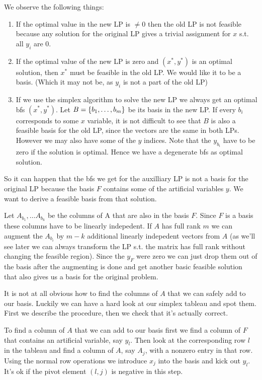 We observe the following things:

\begin{enumerate}
\item If the optimal value in the new LP is $\neq 0$ then the old LP is not feasible because any solution for the original LP gives a trivial assignment for $x$ s.t. all $y_i$ are 0.
\item If the optimal value of the new LP is zero and $(x^*, y^*)$ is an optimal solution, then $x^*$ must be feasible in the old LP. We would like it to be a basis. (Which it may not be, as $y_i$ is not a part of the old LP)
\item If we use the simplex algorithm to solve the new LP we always get an optimal bfs $(x^*,y^*)$. Let $B=\{{b}_1,\ldots,{b}_{m}\}$ be its basis in the new LP. If every $b_i$ corresponds to some $x$ variable, it is not difficult to see that $B$ is also a feasible basis for the old LP, since the vectors are the same in both LPs. However we may also have some of the $y$ indices. Note that the $y_{b_i}$ have to be zero if the solution is optimal. Hence we have a degenerate bfs as optimal solution.
\end{enumerate}

So it can happen that the bfs we get for the auxilliary LP is not a basis for the original LP because the basis $F$ contains some of the artificial variables $y$. We want to derive a feasible basis from that solution.

Let $A_{b_1},\ldots A_{b_k}$ be the columns of A that are also in the basis $F$. Since $F$ is a basis these columns have to be linearly indepedent. If $A$ has full rank $m$ we can augment the $A_{b_i}$ by $m-k$ additional linearly indepedent vectors from $A$ (as we'll see later we can always transform the LP s.t. the matrix has full rank without changing the feasible region). Since the $y_F$ were zero we can just drop them out of the basis after the augmenting is done and get another basic feasible solution that also gives us a basis for the original problem.

It is not at all obvious how to find the columns of $A$ that we can safely add to our basis. Luckily we can have a hard look at our simplex tableau and spot them. First we describe the procedure, then we check that it's actually correct.

To find a column of $A$ that we can add to our basis first we find a column of $F$ that contains an artificial variable, say $y_l$. Then look at the corresponding row $l$ in the tableau and find a column of $A$, say $A_j$, with a nonzero entry in that row. Using the normal row operations we introduce $x_j$ into the basis and kick out $y_l$. It's ok if the pivot element $(l,j)$ is negative in this step.

